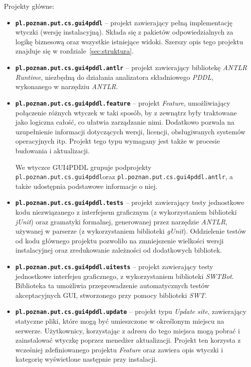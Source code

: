 Projekty główne:
\begin{itemize}
\item \textbf{\texttt{pl.poznan.put.cs.gui4pddl}} -- projekt zawierający pełną implementację wtyczki (wersję instalacyjną). Składa się z pakietów odpowiedzialnych za logikę biznesową oraz wszystkie istniejące widoki. Szerszy opis tego projektu znajduje się w rozdziale~\ref{sec:struktura}.
\item \textbf{\texttt{pl.poznan.put.cs.gui4pddl.antlr}} -- projekt zawierający bibliotekę \textit{ANTLR Runtime}, niezbędną do działania analizatora składniowego \textit{PDDL}, wykonanego w narzędziu \textit{ANTLR}.
\item \textbf{\texttt{pl.poznan.put.cs.gui4pddl.feature}} -- projekt \textit{Feature}, umożliwiający połączenie różnych wtyczek w taki sposób, by z zewnątrz były traktowane jako logiczna całość, co ułatwia zarządzanie nimi. Dodatkowo pozwala na uzupełnienie informacji dotyczących wersji, licencji, obsługiwanych systemów operacyjnych itp. Projekt tego typu wymagany jest także w procesie budowania i aktualizacji.

We wtyczce GUI4PDDL grupuje podprojekty \texttt{pl.poznan.put.cs.gui4pddl}\linebreak oraz \texttt{pl.poznan.put.cs.gui4pddl.antlr}, a także udostępnia podstawowe informacje o niej.
\item \textbf{\texttt{pl.poznan.put.cs.gui4pddl.tests}} -- projekt zawierający testy jednostkowe kodu niezwiązanego z interfejsem graficznym (z wykorzystaniem biblioteki \textit{jUnit}) oraz gramatyki formalnej, generowanej przez narzędzie \textit{ANTLR}, używanej w parserze (z wykorzystaniem biblioteki \textit{gUnit}). Oddzielenie testów od kodu głównego projektu pozwoliło na zmniejszenie wielkości wersji instalacyjnej oraz zredukowanie zależności od dodatkowych bibliotek.
\item \textbf{\texttt{pl.poznan.put.cs.gui4pddl.uitests}} -- projekt zawierający testy jednostkowe interfejsu graficznego, z wykorzystaniem biblioteki \textit{SWTBot}. Biblioteka ta umożliwia przeprowadzenie automatycznych testów akceptacyjnych GUI, stworzonego przy pomocy biblioteki \textit{SWT}.
\item \textbf{\texttt{pl.poznan.put.cs.gui4pddl.update}} -- projekt typu \textit{Update site}, zawierający statyczne pliki, które mogą być umieszczone w określonym miejscu na serwerze. Użytkownicy, korzystając z adresu do tego miejsca mogą pobrać i zainstalować wtyczkę poprzez menedżer aktualizacji. Projekt ten korzysta z wcześniej zdefiniowanego projektu \textit{Feature} oraz zawiera opis wtyczki i kategorię wyświetlone następnie przy instalacji.
\end{itemize}

